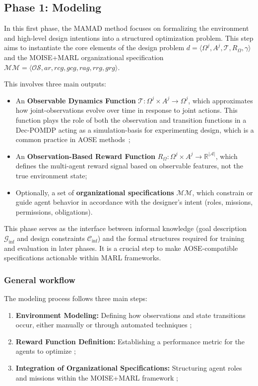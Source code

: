 \documentclass[pdflatex,sn-mathphys-num]{sn-jnl}%
\theoremstyle{thmstyleone}%
\theoremstyle{thmstyletwo}%
\theoremstyle{thmstylethree}%
\begin{document}


\subsection{Phase 1: Modeling}\label{sec:modelling}

In this first phase, the MAMAD method focuses on formalizing the environment and high-level design intentions into a structured optimization problem. This step aims to instantiate the core elements of the design problem $d = \langle \Omega^j, A^j, \mathcal{T}, R_{\Omega}, \gamma \rangle$ and the MOISE+MARL organizational specification $\mathcal{MM} = \langle \mathcal{OS}, ar, rcg, gcg, rag, rrg, grg \rangle$.

This involves three main outputs:

\begin{itemize}
    \item An \textbf{Observable Dynamics Function} $\mathcal{T}: \Omega^j \times A^j \rightarrow \Omega^j$, which approximates how joint-observations evolve over time in response to joint actions. This function plays the role of both the observation and transition functions in a Dec-POMDP acting as a simulation-basis for experimenting design, which is a common practice in AOSE methods~\cite{Jamont2O15};
    \item An \textbf{Observation-Based Reward Function} $R_{\Omega}: \Omega^j \times A^j \rightarrow \mathbb{R}^{|\mathcal{A}|}$, which defines the multi-agent reward signal based on observable features, not the true environment state;
    \item Optionally, a set of \textbf{organizational specifications} $\mathcal{MM}$, which constrain or guide agent behavior in accordance with the designer's intent (roles, missions, permissions, obligations).
\end{itemize}

This phase serves as the interface between informal knowledge (goal description $\mathcal{G}_{\text{inf}}$ and design constraints $\mathcal{C}_{\text{inf}}$) and the formal structures required for training and evaluation in later phases. It is a crucial step to make AOSE-compatible specifications actionable within MARL frameworks.

\subsubsection{{General workflow}}
The modeling process follows three main steps:
\begin{enumerate}
    \item \textbf{Environment Modeling:} Defining how observations and state transitions occur, either manually or through automated techniques ;
    \item \textbf{Reward Function Definition:} Establishing a performance metric for the agents to optimize ;
    \item \textbf{Integration of Organizational Specifications:} Structuring agent roles and missions within the MOISE+MARL framework ;
\end{enumerate}
\end{document}
